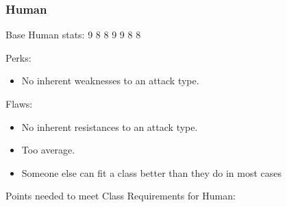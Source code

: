 \documentclass[12pt]{article}
\providecommand{\tightlist}{%
  \setlength{\itemsep}{0pt}\setlength{\parskip}{0pt}}
\begin{document}
\subsubsection{Human}\label{human}

Base Human stats: 9 8 8 9 9 8 8

Perks:

\begin{itemize}
\tightlist
\item
  No inherent weaknesses to an attack type.
\end{itemize}

Flaws:

\begin{itemize}
\tightlist
\item
  No inherent resistances to an attack type.
\item
  Too average.
\item
  Someone else can fit a class better than they do in most cases
\end{itemize}

Points needed to meet Class Requirements for Human:
\end{document}

